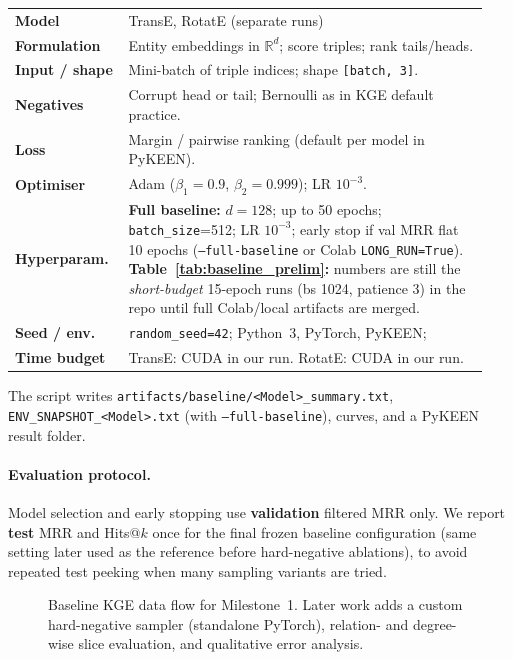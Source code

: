 \documentclass[10pt,a4paper]{article}
\begin{document}
\noindent\small
\begin{tabular}{@{}p{0.22\linewidth}p{0.72\linewidth}@{}}
\textbf{Model} & TransE, RotatE (separate runs) \\
\textbf{Formulation} & Entity embeddings in $\mathbb{R}^d$; score triples; rank tails/heads. \\
\textbf{Input / shape} & Mini-batch of triple indices; shape \texttt{[batch, 3]}. \\
\textbf{Negatives} & Corrupt head or tail; Bernoulli as in KGE default practice. \\
\textbf{Loss} & Margin / pairwise ranking (default per model in PyKEEN). \\
\textbf{Optimiser} & Adam ($\beta_1=0.9$, $\beta_2=0.999$); LR $10^{-3}$. \\
\textbf{Hyperparam.} & \textbf{Full baseline:} $d=128$; up to 50 epochs; \texttt{batch\_size}=512; LR $10^{-3}$; early stop if val MRR flat 10 epochs (\texttt{--full-baseline} or Colab \texttt{LONG\_RUN=True}). \textbf{Table~\ref{tab:baseline_prelim}:} numbers are still the \emph{short-budget} 15-epoch runs (bs 1024, patience 3) in the repo until full Colab/local artifacts are merged. \\
\textbf{Seed / env.} & \texttt{random\_seed=42}; Python~3, PyTorch, PyKEEN; \\
\textbf{Time budget} & TransE: CUDA in our run. RotatE: CUDA in our run. \\
\end{tabular}
\normalsize

The script writes \texttt{artifacts/baseline/<Model>\_summary.txt}, \texttt{ENV\_SNAPSHOT\_<Model>.txt} (with \texttt{--full-baseline}), curves, and a PyKEEN result folder.

\paragraph{Evaluation protocol.} Model selection and early stopping use \textbf{validation} filtered MRR only. We report \textbf{test} MRR and Hits@$k$ once for the final frozen baseline configuration (same setting later used as the reference before hard-negative ablations), to avoid repeated test peeking when many sampling variants are tried.

\begin{figure}[h]
\centering
{}
\caption{Baseline KGE data flow for Milestone~1. Later work adds a custom hard-negative sampler (standalone PyTorch), relation- and degree-wise slice evaluation, and qualitative error analysis.}
\label{fig:pipe}
\end{figure}
\end{document}
